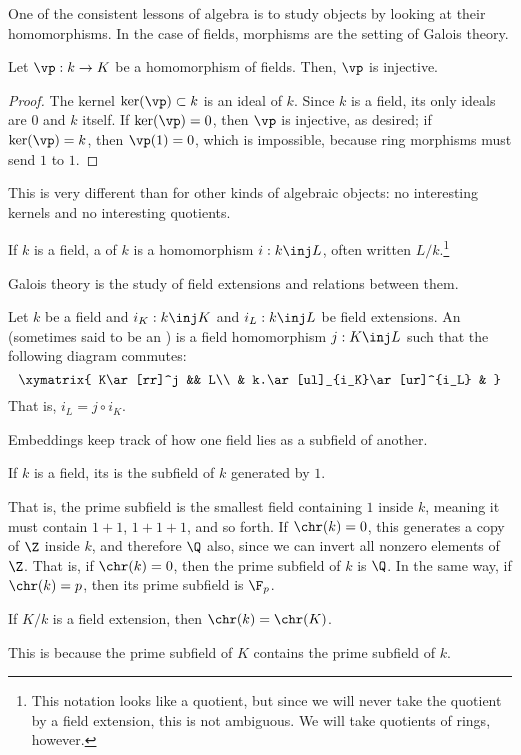 One of the consistent lessons of algebra is to study objects by looking at their homomorphisms. In the case of
fields, morphisms are the setting of Galois theory.
\begin{lem}
Let $\vp:k\to K$ be a homomorphism of fields. Then, $\vp$ is injective.
\end{lem}
\begin{proof}
The kernel $\ker(\vp)\subset k$ is an ideal of $k$. Since $k$ is a field, its only ideals are $0$ and $k$ itself.
If $\ker(\vp) = 0$, then $\vp$ is injective, as desired; if $\ker(\vp) = k$, then $\vp(1) = 0$, which is
impossible, because ring morphisms must send $1$ to $1$.
\end{proof}
This is very different than for other kinds of algebraic objects: no interesting kernels and no interesting
quotients.
\begin{defn}
If $k$ is a field, a  of $k$ is a homomorphism $i:k\inj L$, often written
$L/k$.\footnote{This notation looks like a quotient, but since we will never take the quotient by a field
extension, this is not ambiguous. We will take quotients of rings, however.}
\end{defn}
Galois theory is the study of field extensions and relations between them.
\begin{defn}
Let $k$ be a field and $i_K:k\inj K$ and $i_L:k\inj L$ be field extensions. An 
(sometimes said to be an ) is a field homomorphism $j:K\inj L$ such that the following
diagram commutes:
\[\xymatrix{
	K\ar[rr]^j && L\\
   & k.\ar[ul]_{i_K}\ar[ur]^{i_L} &
}\]
That is, $i_L = j\circ i_K$.
\end{defn}
Embeddings keep track of how one field lies as a subfield of another.
\begin{defn}
If $k$ is a field, its  is the subfield of $k$ generated by $1$.
\end{defn}
That is, the prime subfield is the smallest field containing $1$ inside $k$, meaning it must contain $1+1$,
$1+1+1$, and so forth. If $\chr(k) = 0$, this generates a copy of $\Z$ inside $k$, and therefore $\Q$ also, since
we can invert all nonzero elements of $\Z$. That is, if $\chr(k) = 0$, then the prime subfield of $k$ is $\Q$.
In the same way, if $\chr(k) = p$, then its prime subfield is $\F_p$.
\begin{coro}
If $K/k$ is a field extension, then $\chr(k) = \chr(K)$.
\end{coro}
This is because the prime subfield of $K$ contains the prime subfield of $k$.
